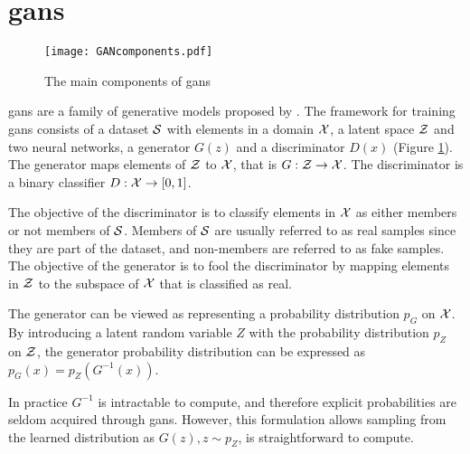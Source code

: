 
\section{\acrlong{gans}}

\begin{figure}[t]
    \centering
    \texttt{[image: GANcomponents.pdf]}
    \caption{The main components of \acrshort{gans}}
    \label{fig:GAN}
\end{figure}

\acrfull{gans} are a family of generative models proposed by \textcite{goodfellow2014generative}. The framework for training \acrshort{gans} consists of a dataset $\mathcal{S}$ with elements in a domain $\mathcal{X}$, a latent space $\mathcal{Z}$ and two neural networks, a generator $G(z)$ and a discriminator $D(x)$ (Figure \ref{fig:GAN}). The generator maps elements of $\mathcal{Z}$ to $\mathcal{X}$, that is $G: \mathcal{Z} \rightarrow \mathcal{X}$. The discriminator is a binary classifier $D: \mathcal{X} \rightarrow [0, 1]$. 

The objective of the discriminator is to classify elements in $\mathcal{X}$ as either members or not members of $\mathcal{S}$. Members of $\mathcal{S}$ are usually referred to as real samples since they are part of the dataset, and non-members are referred to as fake samples. The objective of the generator is to fool the discriminator by mapping elements in $\mathcal{Z}$ to the subspace of $\mathcal{X}$ that is classified as real. 

The generator can be viewed as representing a probability distribution $p_G$ on $\mathcal{X}$. By introducing a latent random variable $Z$ with the probability distribution $p_Z$ on $\mathcal{Z}$, the generator probability distribution can be expressed as $p_G(x) = p_Z(G^{-1}(x))$. 

In practice $G^{-1}$ is intractable to compute, and therefore explicit probabilities are seldom acquired through \acrshort{gans}. However, this formulation allows sampling from the learned distribution as $G(z), z \sim p_Z$, is straightforward to compute. 

